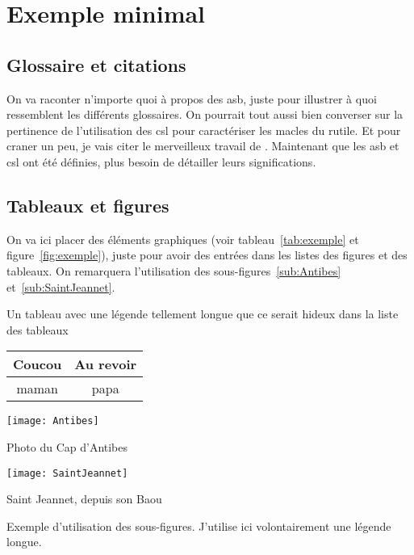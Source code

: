 \section{Exemple minimal}
	\subsection{Glossaire et citations}
		On va raconter n'importe quoi à propos des \gls{asb}, juste pour illustrer à quoi ressemblent les différents glossaires. On pourrait tout aussi bien converser sur la pertinence de l'utilisation des \gls{csl} pour caractériser les \glspl{macle} du \gls{rutile}. Et pour craner un peu, je vais citer le merveilleux travail de \citet{depriester2014thermomechanical}. Maintenant que les \gls{asb} et \gls{csl} ont été définies, plus besoin de détailler leurs significations.
		
	\subsection{Tableaux et figures}
	On va ici placer des éléments graphiques (voir tableau~\ref{tab:exemple} et figure~\ref{fig:exemple}), juste pour avoir des entrées dans les listes des figures et des tableaux. On remarquera l'utilisation des sous-figures~\ref{sub:Antibes} et~\ref{sub:SaintJeannet}.
	
	\begin{tableth}
		\caption[Légende courte pour l'exemple de tableau]{Un tableau avec une légende tellement longue que ce serait hideux dans la liste des tableaux}
			\label{tab:exemple}
		\begin{tabular}{c|c}
			Coucou	& Au revoir\\
			\hline
			maman	& papa
		\end{tabular}
	\end{tableth}

	\begin{figureth}
		\begin{subfigureth}{0.4\textwidth}
			\texttt{[image: Antibes]}
			\caption{Photo du Cap d'Antibes}
				\label{sub:Antibes}
		\end{subfigureth}
		\begin{subfigureth}{0.4\textwidth}
			\texttt{[image: SaintJeannet]}
			\caption{Saint Jeannet, depuis son Baou}
				\label{sub:SaintJeannet}
		\end{subfigureth}
		\caption[Légende courte pour la figure]{Exemple d'utilisation des sous-figures. J'utilise ici volontairement une légende longue.}		
			\label{fig:exemple}
	\end{figureth}
	
